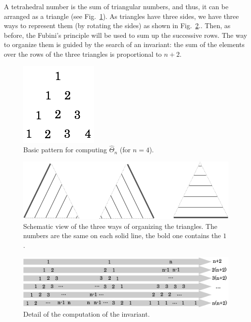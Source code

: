 A tetrahedral number is the sum of triangular numbers, and thus, it can be arranged as a triangle (see Fig.~\ref{fig:Tetrahedral3}).
As triangles have three sides, we have three ways to represent them (by rotating the sides) as shown in Fig.~\ref{fig:Tetrahedral1}..
Then, as before, the Fubini's principle will be used to sum up the successive rows.
The way to organize them is guided by the search of an invariant:
the sum of the elements over the rows of the three triangles is proportional to $n+2$.
\begin{figure}[h]
\begin{center}
        \includegraphics[scale=0.4]{FiguresArithmetic/appTetrahedral3}
        \caption{Basic pattern for computing $\widehat{\Theta}_n$ (for $n=4$).}
        \label{fig:Tetrahedral3}
\end{center}
\end{figure}
\begin{figure}[h]
\begin{center}
        \includegraphics[scale=0.3]{FiguresArithmetic/appTetrahedral1}
        \caption{Schematic view of the three ways of organizing the triangles.
        The numbers are the same on each solid line, the bold one contains the $1$.}
        \label{fig:Tetrahedral1}
\end{center}
\end{figure}
\begin{figure}[h]
\begin{center}
        \includegraphics[scale=0.32]{FiguresArithmetic/appTetrahedral4}
        \caption{Detail of the computation of the invariant.}
        \label{fig:Tetrahedral4}
\end{center}
\end{figure}
